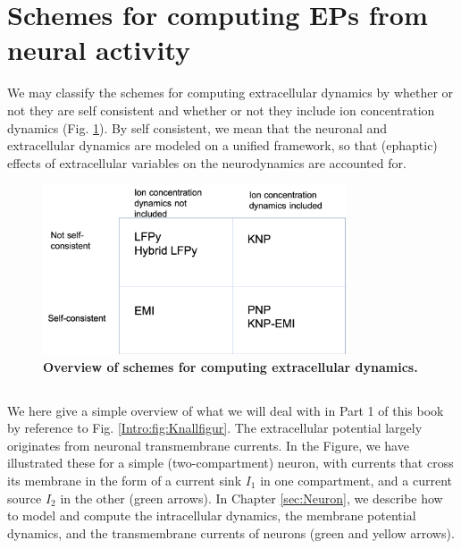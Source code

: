 \section{Schemes for computing EPs from neural activity}
\label{sec:Schemes}


We may classify the schemes for computing extracellular dynamics by whether or not they are self consistent and whether or not they include ion concentration dynamics (Fig. \ref{Schemes:fig:schemes}). By self consistent, we mean that the neuronal and extracellular dynamics are modeled on a unified framework, so that (ephaptic) effects of extracellular variables on the neurodynamics are accounted for. 


\begin{figure}[!ht]
\begin{center}
\includegraphics[width=0.8\textwidth]{Figures/Schemes/schemes.png}
\end{center}
\caption{\textbf{Overview of schemes for computing extracellular dynamics.}}
\label{Schemes:fig:schemes}
\end{figure}

\subsection{}



We here give a simple overview of what we will deal with in Part 1 of this book by reference to Fig. \ref{Intro:fig:Knallfigur}. The extracellular potential largely originates from neuronal transmembrane currents. In the Figure, we have illustrated these for a simple (two-compartment) neuron, with currents that cross its membrane in the form of a current sink $I_1$ in one compartment, and a current source $I_2$ in the other (green arrows). In Chapter \ref{sec:Neuron}, we describe how to model and compute the intracellular dynamics, the membrane potential dynamics, and the transmembrane currents of neurons (green and yellow arrows). 

